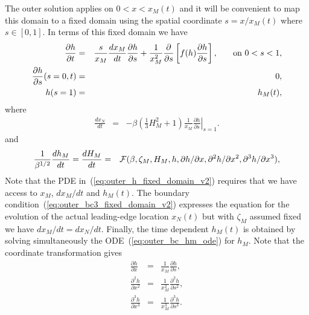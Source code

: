 \documentclass[11pt]{article}
\newcommand{\bea}{\begin{eqnarray}}
\newcommand{\eea}{\end{eqnarray}}
\begin{document}
The outer solution applies on $0 < x < x_M(t)$ and it will be convenient to map this domain to a fixed domain using the spatial coordinate $s=x/x_M(t)$ where $s \in [0,1]$.  In terms of this fixed domain we have
\bea
\label{eq:outer_h_fixed_domain_v2}
\frac{\partial h}{\partial t} & = & \frac{s}{x_M} \frac{dx_M}{dt} \frac{\partial h}{\partial s} + \frac{1}{x_M^2} \frac{\partial}{\partial s} \left[ f(h)\frac{\partial h}{\partial s} \right], \hspace{0.25in} \mbox{on $0 < s < 1$},\\
\label{eq:outer_bc1_fixed_domain_v2}
\frac{\partial h}{\partial s}(s=0,t) & = & 0,\\
\label{eq:outer_bc2_fixed_domain_v2}
h(s=1) & = & h_M(t),
\eea
where
\bea
\label{eq:outer_bc3_fixed_domain_v2}
\frac{dx_N}{dt} & = & - \beta \left( \frac{1}{3} H^2_M + 1 \right) \frac{1}{x_M} \left. \frac{\partial h}{\partial s} \right|_{s=1}.
\eea
and
\bea
\label{eq:outer_bc_hm_ode}
\frac{1}{\beta^{1/2}} \frac{dh_M}{dt} = \frac{dH_M}{dt} & = & {\cal F}(\beta,\zeta_M,H_M,h,\partial h/\partial x, \partial^2 h/\partial x^2 , \partial^3 h/\partial x^3),
\eea
Note that the PDE in~(\ref{eq:outer_h_fixed_domain_v2}) requires that we have access to $x_M$, $dx_M/dt$ and $h_M(t)$.  The boundary condition~(\ref{eq:outer_bc3_fixed_domain_v2}) 
expresses the equation for the evolution of the actual leading-edge location $x_N(t)$ but with $\zeta_M$ assumed fixed we have $dx_M/dt = dx_N/dt$.  Finally, the time dependent 
$h_M(t)$ is obtained by solving simultaneously the ODE~(\ref{eq:outer_bc_hm_ode}) for $h_M$.  Note that the coordinate transformation gives
\bea
\frac{\partial h}{\partial x} & = & \frac{1}{x_M} \frac{\partial h}{\partial s},\\
\frac{\partial^2 h}{\partial x^2} & = & \frac{1}{x_M^2} \frac{\partial^2 h}{\partial s^2},\\
\frac{\partial^3 h}{\partial x^3} & = & \frac{1}{x_M^3} \frac{\partial^3 h}{\partial s^3}.
\eea
\end{document}
